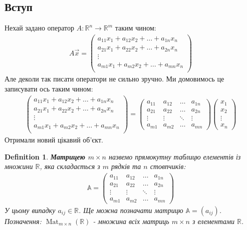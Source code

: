 \documentclass[a4paper, 10pt]{article}
\theoremstyle{theoremdd}
\newtheorem{definition}[theorem]{Definition}
\DeclareMathOperator{\Mat}{Mat}
\begin{document}
	\subsection{Вступ}
	Нехай задано оператор $A \colon \mathbb{R}^n \to \mathbb{R}^m$ таким чином:
	\begin{align*}
	A\vec{x} = \begin{pmatrix}
	a_{11}x_1 + a_{12}x_2 + \dots + a_{1n}x_n \\
	a_{21}x_1 + a_{22}x_2 + \dots + a_{2n}x_n \\
	\vdots \\
	a_{m1}x_1 + a_{m2}x_2 + \dots + a_{mn}x_n \\
	\end{pmatrix}
	\end{align*}
	Але деколи так писати оператори не сильно зручно. Ми домовимось це записувати ось таким чином:
	\begin{align*}
	\begin{pmatrix}
	a_{11}x_1 + a_{12}x_2 + \dots + a_{1n}x_n \\
	a_{21}x_1 + a_{22}x_2 + \dots + a_{2n}x_n \\
	\vdots \\
	a_{m1}x_1 + a_{m2}x_2 + \dots + a_{mn}x_n \\
	\end{pmatrix} = \begin{pmatrix}
	a_{11} & a_{12} & \dots & a_{1n} \\
	a_{21} & a_{22} & \dots & a_{2n} \\
	\vdots & \vdots & \ddots & \vdots \\
	a_{m1} & a_{m2} & \dots & a_{mn}
	\end{pmatrix} \begin{pmatrix}
	x_1 \\ x_2 \\ \vdots \\ x_n
	\end{pmatrix}
	\end{align*}
	Отримали новий цікавий об'єкт.
	\begin{definition}
	\textbf{Матрицею $m \times n$} назвемо прямокутну таблицю елементів із множини $\mathbb{R}$, яка складається з $m$ рядків та $n$ стовпчиків:
	\begin{align*}
	\mathbb{A} = \begin{pmatrix}
	a_{11} & a_{12} & \dots & a_{1n} \\
	a_{21} & a_{22} & \dots & a_{2n} \\
	\vdots & \vdots & \ddots & \vdots \\
	a_{m1} & a_{m2} & \dots & a_{mn}
	\end{pmatrix}
	\end{align*}
	У цьому випадку $a_{ij} \in \mathbb{R}$. Ще можна позначати матрицю $\mathbb{A} = (a_{ij})$.\\
	Позначення: $\Mat_{m \times n}(\mathbb{R})$ - множина всіх матриць $m \times n$ з елементами $\mathbb{R}$.
	\end{definition}
	
\end{document}
